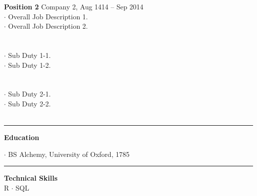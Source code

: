 \documentclass[letterpaper, onecolumn, oneside]{article}
\newcommand{\dotindent}{\hspace*{.25in}$\cdot$ }
\newcommand{\spaceindent}{\hspace*{0.1in}}
\begin{document}
\begin{flushleft}


\textbf{\large Position 2} Company 2, Aug 1414 -- Sep 2014 \\
\dotindent Overall Job Description 1. \\
\dotindent Overall Job Description 2.\\
~\\

\spaceindent {\bf Major Sub Duty 1} \\
\dotindent Sub Duty 1-1.\\
\dotindent Sub Duty 1-2.\\
~\\

\spaceindent {\bf Major Sub Duty 2} \\
\dotindent Sub Duty 2-1.\\
\dotindent Sub Duty 2-2.\\
~\\

\textcolor{litegrey}{\rule{\textwidth}{.1pt}}

\vspace*{0.1in}
\textbf{\large Education}
\vspace*{0.05in}

\dotindent BS Alchemy, University of Oxford, 1785

\textcolor{litegrey}{\rule{\textwidth}{.1pt}}

\end{flushleft}


\begin{centering}

{\bf Technical Skills} \\
R $\cdot$ SQL \\

\end{centering}
\end{document}
